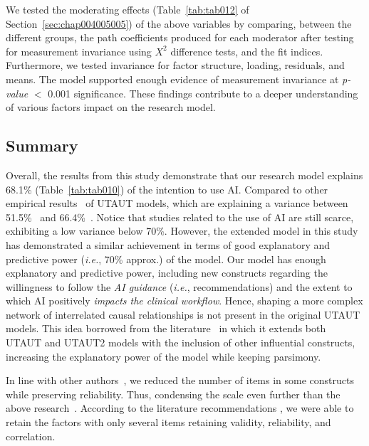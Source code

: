 We tested the moderating effects (Table~\ref{tab:tab012} of Section~\ref{sec:chap004005005}) of the above variables by comparing, between the different groups, the path coefficients produced for each moderator after testing for measurement invariance using $X^2$ difference tests, and the fit indices.
Furthermore, we tested invariance for factor structure, loading, residuals, and means.
The model supported enough evidence of measurement invariance at {\it p-value} $<$ 0.001 significance.
These findings contribute to a deeper understanding of various factors impact on the research model.

\subsection{Summary}
\label{chap:app003004006}

Overall, the results from this study demonstrate that our research model explains 68.1\% (Table~\ref{tab:tab010}) of the intention to use \ac{AI}.
Compared to other empirical results~\cite{LIU2022107026, info:doi/10.2196/14316} of \ac{UTAUT} models, which are explaining a variance between 51.5\%~\cite{LIU2022107026} and 66.4\%~\cite{info:doi/10.2196/14316}.
Notice that studies related to the use of \ac{AI} are still scarce, exhibiting a low variance below 70\%.
However, the extended model in this study has demonstrated a similar achievement in terms of good explanatory and predictive power ({\it i.e.}, 70\% approx.) of the model.
Our model has enough explanatory and predictive power, including new constructs regarding the willingness to follow the {\it AI guidance} ({\it i.e.}, recommendations) and the extent to which \ac{AI} positively {\it impacts the clinical workflow}.
Hence, shaping a more complex network of interrelated causal relationships is not present in the original \ac{UTAUT} models.
This idea borrowed from the literature~\cite{KHALILZADEH2017460, SIGERSON201887} in which it extends both \ac{UTAUT} and \ac{UTAUT}2 models with the inclusion of other influential constructs, increasing the explanatory power of the model while keeping parsimony.

In line with other authors~\cite{https://doi.org/10.1111/joca.12267, snyder2020oxford}, we reduced the number of items in some constructs while preserving reliability.
Thus, condensing  the scale even further than the above research~\cite{KHALILZADEH2017460}.
According to the literature recommendations \cite{SIGERSON201887}, we were able to retain the factors with only several items retaining validity, reliability, and correlation.

